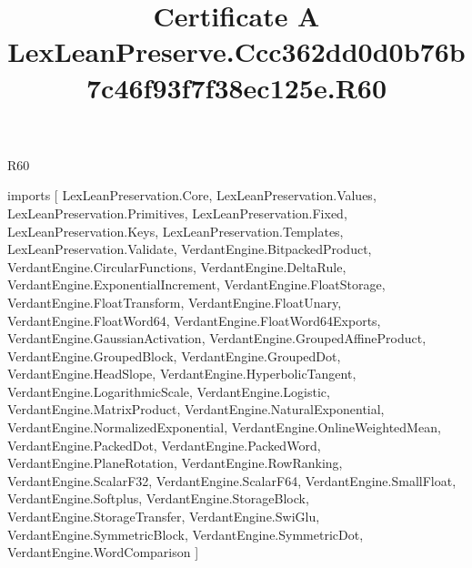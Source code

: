 \begin{lexlean}{R60}
\title{Certificate A LexLeanPreserve.Ccc362dd0d0b76b7c46f93f7f38ec125e.R60}
\begin{coremodule}
imports [
  LexLeanPreservation.Core,
  LexLeanPreservation.Values,
  LexLeanPreservation.Primitives,
  LexLeanPreservation.Fixed,
  LexLeanPreservation.Keys,
  LexLeanPreservation.Templates,
  LexLeanPreservation.Validate,
  VerdantEngine.BitpackedProduct,
  VerdantEngine.CircularFunctions,
  VerdantEngine.DeltaRule,
  VerdantEngine.ExponentialIncrement,
  VerdantEngine.FloatStorage,
  VerdantEngine.FloatTransform,
  VerdantEngine.FloatUnary,
  VerdantEngine.FloatWord64,
  VerdantEngine.FloatWord64Exports,
  VerdantEngine.GaussianActivation,
  VerdantEngine.GroupedAffineProduct,
  VerdantEngine.GroupedBlock,
  VerdantEngine.GroupedDot,
  VerdantEngine.HeadSlope,
  VerdantEngine.HyperbolicTangent,
  VerdantEngine.LogarithmicScale,
  VerdantEngine.Logistic,
  VerdantEngine.MatrixProduct,
  VerdantEngine.NaturalExponential,
  VerdantEngine.NormalizedExponential,
  VerdantEngine.OnlineWeightedMean,
  VerdantEngine.PackedDot,
  VerdantEngine.PackedWord,
  VerdantEngine.PlaneRotation,
  VerdantEngine.RowRanking,
  VerdantEngine.ScalarF32,
  VerdantEngine.ScalarF64,
  VerdantEngine.SmallFloat,
  VerdantEngine.Softplus,
  VerdantEngine.StorageBlock,
  VerdantEngine.StorageTransfer,
  VerdantEngine.SwiGlu,
  VerdantEngine.SymmetricBlock,
  VerdantEngine.SymmetricDot,
  VerdantEngine.WordComparison
]


\end{coremodule}
\end{lexlean}
